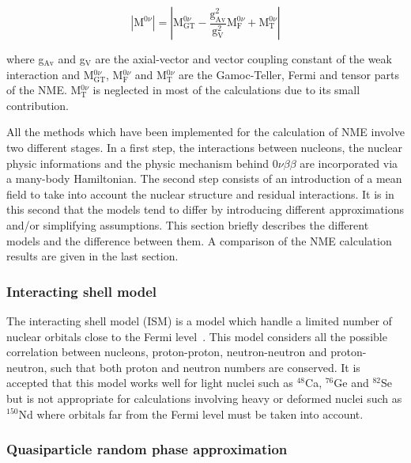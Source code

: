 \documentclass[main.tex]{subfiles}
\begin{document}
\begin{equation}
|\text{M}^{0\nu}| = |\text{M}_{\text{GT}}^{0\nu} - \frac{\text{g}_{\text{Av}}^\text{2}}{\text{g}_\text{V}^\text{2}} \text{M}_\text{F}^{0\nu} + \text{M}_\text{T}^{0\nu}|
\end{equation}


\bigskip


\NI where g$_{\text{Av}}$ and g$_\text{V}$ are the axial-vector and vector coupling constant of the weak interaction and M$_{\text{GT}}^{0\nu}$, M$_{\text{F}}^{0\nu}$ and M$_{\text{T}}^{0\nu}$ are the Gamoc-Teller, Fermi and tensor parts of the NME. M$_{\text{T}}^{0\nu}$ is neglected in most of the calculations due to its small contribution.


\bigskip


\NI All the methods which have been implemented for the calculation of NME involve two different stages. In a first step, the interactions between nucleons, the nuclear physic informations and the physic mechanism behind 0$\nu\beta\beta$ are incorporated via a many-body Hamiltonian. The second step consists of an introduction of a mean field to take into account the nuclear structure and residual interactions. It is in this second that the models tend to differ by introducing different approximations and/or simplifying assumptions. This section briefly describes the different models and the difference between them. A comparison of the NME calculation results are given in the last section. 


\subsubsection{Interacting shell model}


\NI The interacting shell model (ISM) is a model which handle a limited number of nuclear orbitals close to the Fermi level~\cite{ISM_1,ISM_2,ISM_3,ISM_4}. This model considers all the possible correlation between nucleons, proton-proton, neutron-neutron and proton-neutron, such that both proton and neutron numbers are conserved. It is accepted that this model works well for light nuclei such as $^{\text{48}}$Ca, $^{\text{76}}$Ge and $^{\text{82}}$Se but is not appropriate for calculations involving heavy or deformed nuclei such as $^{\text{150}}$Nd where orbitals far from the Fermi level must be taken into account.


\subsubsection{Quasiparticle random phase approximation}
\end{document}
